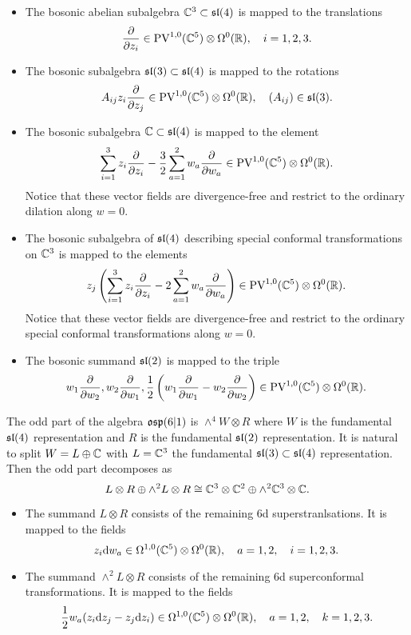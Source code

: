 \begin{itemize}[leftmargin=\parindent]
\item
The bosonic abelian subalgebra $\mathbb C^3 \subset \mathfrak{sl}(4)$ is mapped to the translations 
\[
\frac{\partial}{\partial z_i} \in {\rm PV}^{1,0}(\mathbb C^5) \otimes \Omega^0(\mathbb R) , \quad i=1,2,3.
\]

\item
The bosonic subalgebra $\mathfrak{sl}(3) \subset \mathfrak{sl}(4)$ is mapped to the 
rotations
\[
A_{ij} z_i \frac{\partial}{\partial z_j} \in {\rm PV}^{1,0}(\mathbb C^5)\otimes \Omega^0(\mathbb R) , \quad (A_{ij}) \in \mathfrak{sl}(3) .
\]

\item
The bosonic subalgebra $\mathbb C \subset \mathfrak{sl}(4)$ is mapped to the element
\[
\sum_{i=1}^3 z_i \frac{\partial}{\partial z_i} - \frac32 \sum_{a=1}^2 w_a \frac{\partial}{\partial w_a} \in {\rm PV}^{1,0}(\mathbb C^5) \otimes \Omega^0(\mathbb R)  .
\] 
Notice that these vector fields are divergence-free and restrict to the ordinary dilation along $w=0$. 
\item 
The bosonic subalgebra of $\mathfrak{sl}(4)$ describing special conformal transformations on $\mathbb C^3$ is mapped to the elements 
\[
z_j \left(\sum_{i=1}^3 z_i \frac{\partial}{\partial z_i} - 2 \sum_{a=1}^2 w_a \frac{\partial}{\partial w_a} \right) \in {\rm PV}^{1,0}(\mathbb C^5) \otimes \Omega^0(\mathbb R) .
\] 
Notice that these vector fields are divergence-free and restrict to the ordinary special conformal transformations along $w=0$. 
\item 
The bosonic summand $\mathfrak{sl}(2)$ is mapped to the triple
\[
w_1 \frac{\partial}{\partial w_2}, w_2 \frac{\partial}{\partial w_1}, \frac12 \left(w_1 \frac{\partial}{\partial w_1} - w_2 \frac{\partial}{\partial w_2}\right) \in {\rm PV}^{1,0}(\mathbb C^5) \otimes \Omega^0(\mathbb R) .
\]
\end{itemize}

The odd part of the algebra $\mathfrak{osp}(6|1)$ is $\wedge^4 W \otimes R$ where $W$ is the fundamental $\mathfrak{sl}(4)$ representation and $R$ is the fundamental $\mathfrak{sl}(2)$ representation. 
It is natural to split $W = L \oplus \mathbb C$ with $L = \mathbb C^3$ the fundamental $\mathfrak{sl}(3) \subset \mathfrak{sl}(4)$ representation. 
Then the odd part decomposes as
\[
L \otimes R \oplus \wedge^2 L \otimes R \cong \mathbb C^3 \otimes \mathbb C^2 \oplus \wedge^2 \mathbb C^3 \otimes \mathbb C .
\]

\begin{itemize} 
\item The summand $L \otimes R$ consists of the remaining 6d superstranlsations. 
It is mapped to the fields 
\[
z_i {\rm d} w_a \in \Omega^{1,0}(\mathbb C^5) \otimes \Omega^0(\mathbb R) ,\quad a=1,2, \quad i =1,2,3.
\] 
\item The summand $\wedge^2 L \otimes R$ consists of the remaining 6d superconformal transformations. 
It is mapped to the fields
\[
\frac12 w_a (z_i {\rm d} z_j - z_j {\rm d} z_i) \in \Omega^{1,0}(\mathbb C^5)\otimes \Omega^0(\mathbb R) , \quad a = 1,2, \quad k = 1,2,3. 
\]
\end{itemize}

